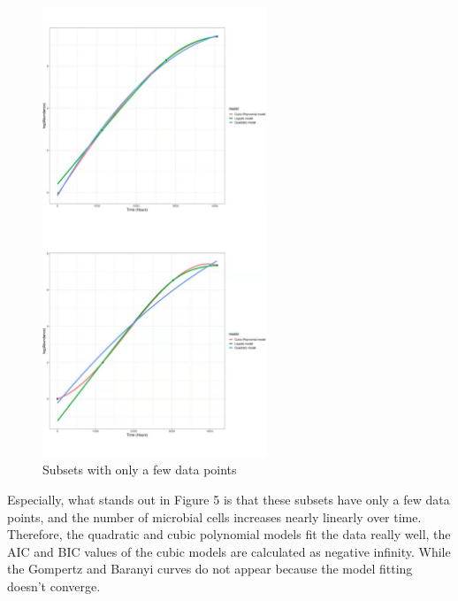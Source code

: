 \documentclass[11pt, a4paper]{article}
\begin{document}
\begin{figure}[H]
    \centering
    \includegraphics[width=0.6\textwidth]{figure5}
    \caption{Subsets with only a few data points}
    \label{figure5}
\end{figure}
Especially, what stands out in Figure 5 is that these subsets have only a few data points, and the number of microbial cells increases nearly linearly over time. Therefore, the quadratic and cubic polynomial models fit the data really well, the AIC and BIC values of the cubic models are calculated as negative infinity. While the Gompertz and Baranyi curves do not appear because the model fitting doesn’t converge.  
\end{document}
